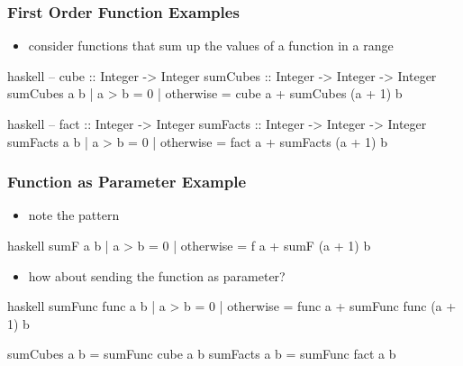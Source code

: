 \documentclass[dvipsnames]{beamer}
\theoremstyle{plain}
\begin{document}
\begin{frame}[fragile]
  \frametitle{First Order Function Examples}

  \begin{itemize}
    \item consider functions that sum up the values of a function in a range
  \end{itemize}

  \begin{exampleblock}{}
    \begin{pygments}{haskell}
-- cube :: Integer -> Integer
sumCubes :: Integer -> Integer -> Integer
sumCubes a b
  | a > b     = 0
  | otherwise = cube a + sumCubes (a + 1) b
    \end{pygments}

    \pause
    \begin{pygments}{haskell}
-- fact :: Integer -> Integer
sumFacts :: Integer -> Integer -> Integer
sumFacts a b
  | a > b     = 0
  | otherwise = fact a + sumFacts (a + 1) b
    \end{pygments}
  \end{exampleblock}
\end{frame}

\begin{frame}[fragile]
  \frametitle{Function as Parameter Example}

  \begin{itemize}
    \item note the pattern
  \end{itemize}

  \begin{exampleblock}{}
    \begin{pygments}{haskell}
sumF a b
  | a > b     = 0
  | otherwise = f a + sumF (a + 1) b
    \end{pygments}
  \end{exampleblock}

  \pause
  \begin{itemize}
    \item how about sending the function as parameter?
  \end{itemize}

  \begin{exampleblock}{}
    \begin{pygments}{haskell}
sumFunc func a b
  | a > b     = 0
  | otherwise = func a + sumFunc func (a + 1) b

sumCubes a b = sumFunc cube a b
sumFacts a b = sumFunc fact a b
    \end{pygments}
  \end{exampleblock}
\end{frame}
\end{document}
